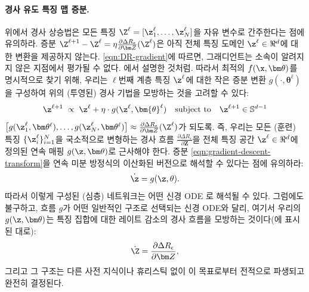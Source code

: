 \documentclass[../../book-main_ko.tex]{subfiles}
\begin{document}
\paragraph{경사 유도 특징 맵 증분.} 위에서 경사 상승법은 모든 특징 $\Z^{\ell} = [\z^{\ell}_{1}, \dots, \z^{\ell}_{N}]$을 자유 변수로 간주한다는 점에 유의하라. 증분 $\Z^{\ell+1} - \Z^{\ell} = \eta \frac{\partial \Delta R_{\epsilon}}{\partial \bm Z}(\Z^\ell)$은 아직 전체 특징 도메인 $\z^\ell \in \Re^d$에 대한 변환을 제공하지 않는다. \eqref{eqn:DR-gradient}에 따르면, 그래디언트는 소속이 알려지지 않은 지점에서 평가될 수 없다. 에서 설명한 것처럼. 따라서 최적의 $f(\x,\bm  \theta)$를 명시적으로 찾기 위해, 우리는 $\ell$번째 계층 특징 $\z^\ell$에 대한 작은 증분 변환 $g(\cdot, \bm{\theta}^{\ell})$을 구성하여 위의 (투영된) 경사 기법을 모방하는 것을 고려할 수 있다:
\begin{equation}
\z^{\ell + 1}   \; \propto \; \z^{\ell} + \eta\cdot  g(\z^{\ell}, \bm{\theta}^{\ell}) \quad \mbox{subject to} \quad \z^{\ell +1} \in \mathbb{S}^{d-1}
\label{eqn:gradient-descent-transform}
\end{equation}
$\big[g(\z_1^{\ell}, \bm \theta^{\ell}), \ldots, g(\z_N^{\ell}, \bm \theta^{\ell}) \big] \approx \frac{\partial \Delta R_{\epsilon}}{\partial \bm Z}(\Z^\ell)$가 되도록. 즉, 우리는 모든 (훈련) 특징 $\{\z_i^\ell\}_{i=1}^N$을 국소적으로 변형하는 경사 흐름 $\frac{\partial \Delta R_{\epsilon}}{\partial \bm Z}$을 전체 특징 공간 $\z^\ell \in \Re^d$에 정의된 연속 매핑 $g(\z,\bm \theta)$로 근사해야 한다.  
증분 \eqref{eqn:gradient-descent-transform}을 연속 미분 방정식의 이산화된 버전으로 해석할 수 있다는 점에 유의하라:
\begin{equation}
\dot{\z} = g(\z, \theta).
\end{equation}
따라서 이렇게 구성된 (심층) 네트워크는 어떤 신경 ODE \cite{chen2018neural}로 해석될 수 있다. 그럼에도 불구하고, 흐름 $g$가 어떤 일반적인 구조로 선택되는 신경 ODE와 달리, 여기서 우리의 $g(\z, \bm\theta)$는 특징 집합에 대한 레이트 감소의 경사 흐름을 모방하는 것이다(에 표시된 대로): 
\begin{equation*}
    \dot{\Z} = \frac{\partial \Delta R_{\epsilon}}{\partial \bm Z},
\end{equation*} 
그리고 그 구조는 다른 사전 지식이나 휴리스틱 없이 이 목표로부터 전적으로 파생되고 완전히 결정된다.  
\end{document}
